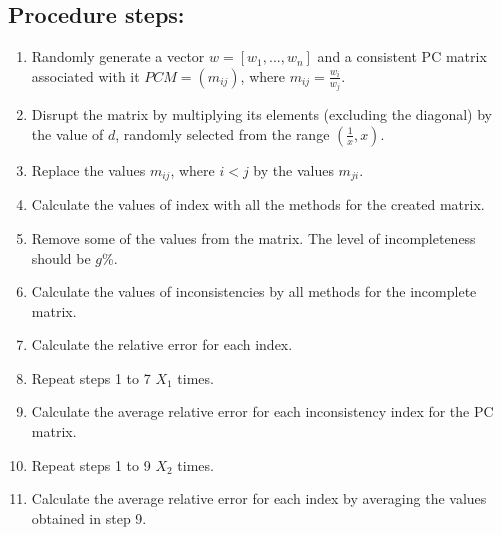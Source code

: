 \subsection{Procedure steps:}
\begin{enumerate}
\item Randomly generate a vector $w=[w_{1},...,w_{n}]$ and a consistent PC matrix associated with it $PCM=\left(m_{ij}\right)$, where $m_{ij}=\frac{w_{i}}{w_{j}}$.
\item Disrupt the matrix by multiplying its elements (excluding the diagonal) by the value of $d$, randomly selected from the range $\left(\frac{1}{x},x\right)$.

\item Replace the values $m_{ij}$, where $i<j$ by the values $m_{ji}$.

\item Calculate the values of index with all the methods for the created matrix.

\item Remove some of the values from the matrix. The level of incompleteness should be $g$\%.

\item Calculate the values of inconsistencies by all methods for the incomplete matrix.

\item Calculate the relative error for each index.

\item Repeat steps 1 to 7 $X_{1}$ times.

\item Calculate the average relative error for each inconsistency index for the PC matrix.

\item Repeat steps 1 to 9 $X_{2}$ times.

\item Calculate the average relative error for each index by averaging the values obtained in step 9.

\end{enumerate}


